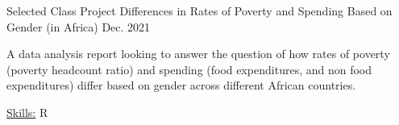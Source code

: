 \begin{cventries}
  \cventry
    {Selected Class Project} %
    {Differences in Rates of Poverty and Spending Based on Gender (in Africa)} %
    {} %
    {Dec. 2021} %
    {
      \begin{cvitems} %
        \item {A data analysis report looking to answer the question of how rates of poverty (poverty headcount ratio) and spending (food expenditures, and non food expenditures) differ based on gender across different African countries.}
        \item{\underline{Skills:} R}
      \end{cvitems}
    }
    
\end{cventries}
